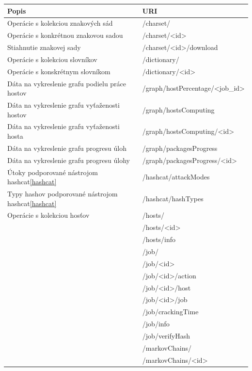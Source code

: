 \documentclass[slovak]{fitthesis}
\begin{document}
\begin{table}[h]
  \begin{center}
        \begin{tabular}{ |p{8cm}|p{7.4cm}|  }
         \hline
         Popis& URI\\
         \hline
          Operácie s kolekciou znakových sád & /charset/ \\
          Operácie s konkrétnou znakovou sadou & /charset/<id> \\
          Stiahnutie znakovej sady & /charset/<id>/download \\
          Operácie s kolekciou slovníkov & /dictionary/ \\
          Operácie s konskrétnym slovníkom & /dictionary/<id> \\
          Dáta na vykreslenie grafu podielu práce hostov & /graph/hostPercentage/<job\_id> \\
          Dáta na vykreslenie grafu vyťaženosti hostov & /graph/hostsComputing \\
          Dáta na vykreslenie grafu vyťaženosti hosta & /graph/hostsComputing/<id> \\
          Dáta na vykreslenie grafu progresu úloh & /graph/packagesProgress \\
          Dáta na vykreslenie grafu progresu úlohy & /graph/packagesProgress/<id> \\
          Útoky podporované nástrojom hashcat\ref{hashcat} & /hashcat/attackModes \\
          Typy hashov podporované nástrojom hashcat\ref{hashcat} & /hashcat/hashTypes \\
          Operácie s kolekciou hosťov & /hosts/ \\
           & /hosts/<id> \\
           & /hosts/info \\
           & /job/ \\
           & /job/<id> \\
           & /job/<id>/action \\
           & /job/<id>/host \\
           & /job/<id>/job \\
           & /job/crackingTime \\
           & /job/info \\
           & /job/verifyHash \\
           & /markovChains/ \\
           & /markovChains/<id> \\

\end{tabular}
\end{center}
\end{table}
\end{document}
